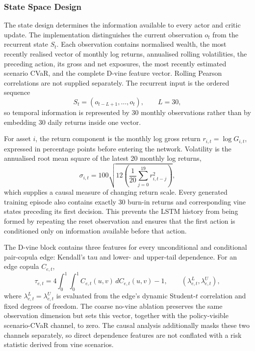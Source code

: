 \subsubsection{State Space Design}
\label{subsubsec:3_state_space_design}

The state design determines the information available to every actor and critic update. The implementation distinguishes the current observation $o_t$ from the recurrent state $S_t$. Each observation contains normalised wealth, the most recently realised vector of monthly log returns, annualised rolling volatilities, the preceding action, its gross and net exposures, the most recently estimated scenario CVaR, and the complete D-vine feature vector. Rolling Pearson correlations are not supplied separately. The recurrent input is the ordered sequence
%
\begin{equation}
S_t=(o_{t-L+1},\ldots,o_t), \qquad L=30,
\label{eq:recurrent_state}
\end{equation}
%
so temporal information is represented by 30 monthly observations rather than by embedding 30 daily returns inside one vector.

For asset $i$, the return component is the monthly log gross return $r_{i,t}=\log G_{i,t}$, expressed in percentage points before entering the network. Volatility is the annualised root mean square of the latest 20 monthly log returns,
%
\begin{equation}
\sigma_{i,t}=100\sqrt{12\left(\frac{1}{20}\sum_{j=0}^{19}r_{i,t-j}^{2}\right)},
\label{eq:volatility}
\end{equation}
%
which supplies a causal measure of changing return scale. Every generated training episode also contains exactly 30 burn-in returns and corresponding vine states preceding its first decision. This prevents the LSTM history from being formed by repeating the reset observation and ensures that the first action is conditioned only on information available before that action.

The D-vine block contains three features for every unconditional and conditional pair-copula edge: Kendall's tau and lower- and upper-tail dependence. For an edge copula $C_{e,t}$,
%
\begin{equation}
\tau_{e,t}=4\int_0^1\int_0^1 C_{e,t}(u,v)\,dC_{e,t}(u,v)-1,
\qquad
(\lambda^L_{e,t},\lambda^U_{e,t}),
\label{eq:vine_state_features}
\end{equation}
%
where $\lambda^L_{e,t}=\lambda^U_{e,t}$ is evaluated from the edge's dynamic Student-$t$ correlation and fixed degrees of freedom. The coarse no-vine ablation preserves the same observation dimension but sets this vector, together with the policy-visible scenario-CVaR channel, to zero. The causal analysis additionally masks these two channels separately, so direct dependence features are not conflated with a risk statistic derived from vine scenarios.

